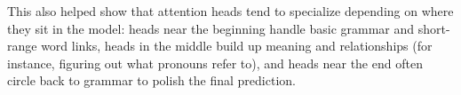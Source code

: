 This also helped show that attention heads tend to specialize depending on
where they sit in the model: heads near the beginning handle basic grammar and
short-range word links, heads in the middle build up meaning and relationships
(for instance, figuring out what pronouns refer to), and heads near the end
often circle back to grammar to polish the final prediction.



%

